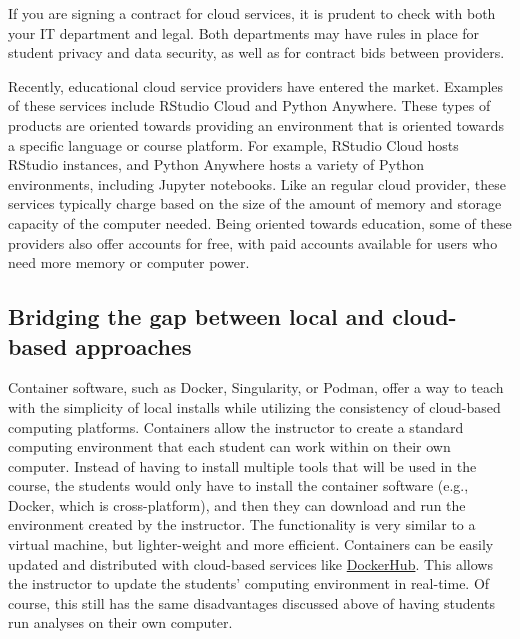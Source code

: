 {\begin{framed}
If you are signing a contract for cloud services, it is prudent to check with both your IT department and legal. 
Both departments may have rules in place for student privacy and data security, as well as for contract bids between providers.
\end{framed}}

Recently, educational cloud service providers have entered the market.
Examples of these services include RStudio Cloud and Python Anywhere. 
These types of products are oriented towards providing an environment that is oriented towards a specific language or course platform. 
For example, RStudio Cloud hosts RStudio instances, and Python Anywhere hosts a variety of Python environments, including Jupyter notebooks. 
Like an regular cloud provider, these services typically charge based on the size of the amount of memory and storage capacity of the computer needed.
Being oriented towards education, some of these providers also offer accounts for free, with paid accounts available for users who need more memory or computer power.

\subsection{Bridging the gap between local and cloud-based approaches}

Container software, such as
Docker,
Singularity,
or
Podman,
offer a way to teach with the simplicity of local installs while utilizing the consistency of
cloud-based computing platforms.
Containers allow the instructor to create a standard computing environment that
each student can work within on their own computer.
Instead of having to install multiple tools that will be used in the course,
the students would only have to install the container software (e.g., Docker,
which is cross-platform), and then they can download and run the environment
created by the instructor.
The functionality is very similar to a virtual machine, but lighter-weight and
more efficient.
Containers can be easily updated and distributed with cloud-based
services like
\href{https://hub.docker.com/}{DockerHub}.
This allows the instructor to update the students' computing environment in
real-time.
Of course, this still has the same disadvantages discussed above of having
students run analyses on their own computer.

